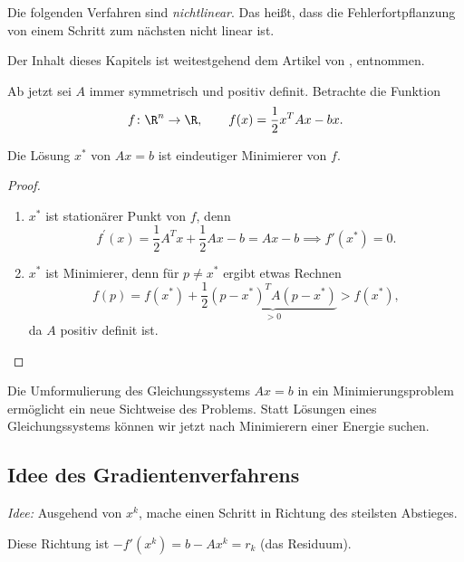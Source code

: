 \medskip

Die folgenden Verfahren sind \emph{nichtlinear}.  Das heißt, dass die Fehlerfortpflanzung von
einem Schritt zum nächsten nicht linear ist.

\medskip

Der Inhalt dieses Kapitels ist weitestgehend dem Artikel von \citeauthor{shewchuk:1994},
 \cite{shewchuk:1994} entnommen.

\bigskip

Ab jetzt sei $A$ immer symmetrisch und positiv definit. Betrachte die Funktion
\begin{equation*}
 f \colon \R^n \to \R,
 \qquad
 f(x) = \frac{1}{2} x^TAx-bx.
\end{equation*}

\begin{satz}
Die Lösung $x^*$ von $Ax=b$ ist eindeutiger Minimierer von $f$.
\end{satz}
\begin{proof}
\begin{enumerate}
 \item $x^*$ ist stationärer Punkt von $f$, denn
  \begin{equation*}
    f^{\prime}(x)=\frac{1}{2}A^Tx+\frac{1}{2}Ax-b=Ax-b
    \implies
    f' (x^*)=0.
  \end{equation*}
 \item $x^*$ ist Minimierer, denn für $p \neq x^*$ ergibt etwas Rechnen
  \begin{equation*}
   f(p)=f(x^*)+\frac{1}{2} \underbrace{\left(p-x^* \right)^TA \left(p-x^* \right)}_{>0}>f(x^*),
  \end{equation*}
  da $A$ positiv definit ist. \qedhere
\end{enumerate}
\end{proof}

Die Umformulierung des Gleichungssystems $Ax=b$ in ein Minimierungsproblem ermöglicht ein neue
Sichtweise des Problems.  Statt Lösungen eines Gleichungssystems können wir jetzt nach
Minimierern einer Energie suchen.


\subsection{Idee des Gradientenverfahrens}

\emph{Idee:} Ausgehend von $x^k$, mache einen Schritt in Richtung des steilsten Abstieges.

\medskip

Diese Richtung ist $-f' (x^k)=b-Ax^k=r_k$ (das Residuum).

